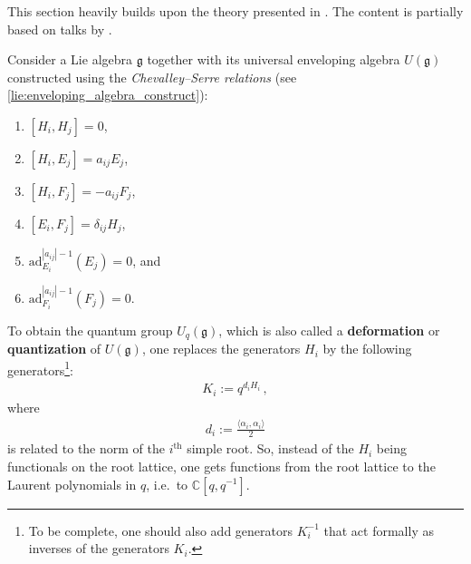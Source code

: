     This section heavily builds upon the theory presented in . The content is partially based on talks by .

    \begin{construct}
        Consider a Lie algebra $\mathfrak{g}$ together with its universal enveloping algebra $U(\mathfrak{g})$ constructed using the \textit{Chevalley--Serre relations} (see \cref{lie:enveloping_algebra_construct}):
        \begin{enumerate}
            \item $[H_i,H_j] = 0$,
            \item $[H_i,E_j] = a_{ij}E_j$,
            \item $[H_i,F_j] = -a_{ij}F_j$,
            \item $[E_i,F_j] = \delta_{ij}H_j$,
            \item $\mathrm{ad}_{E_i}^{|a_{ij}|-1}(E_j) = 0$, and
            \item $\mathrm{ad}_{F_i}^{|a_{ij}|-1}(F_j) = 0$.
        \end{enumerate}
         To obtain the quantum group $U_q(\mathfrak{g})$, which is also called a \textbf{deformation} or \textbf{quantization} of $U(\mathfrak{g})$, one replaces the generators $H_i$ by the following generators\footnote{To be complete, one should also add generators $K_i^{-1}$ that act formally as inverses of the generators $K_i$.}:
        \begin{gather}
            K_i := q^{d_iH_i}\,,
        \end{gather}
        where
        \begin{gather}
            d_i := \frac{\langle\alpha_i,\alpha_i\rangle}{2}
        \end{gather}
        is related to the norm of the $i^{\text{th}}$ simple root. So, instead of the $H_i$ being functionals on the root lattice, one gets functions from the root lattice to the Laurent polynomials in $q$, i.e.~to $\mathbb{C}[q,q^{-1}]$.


\end{construct}
